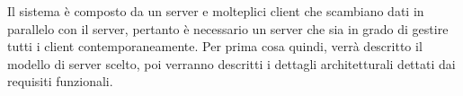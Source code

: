 Il sistema è composto da un server e molteplici client che scambiano dati in parallelo con il server, pertanto è necessario un server che sia in grado di gestire tutti i client contemporaneamente. Per prima cosa quindi, verrà descritto il modello di server scelto, poi verranno descritti i dettagli architetturali dettati dai requisiti funzionali.
